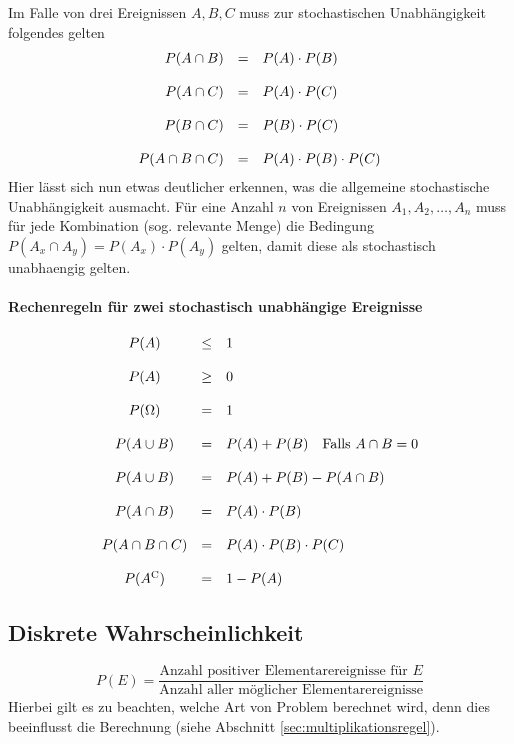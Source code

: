 Im Falle von drei Ereignissen $A,B,C$ muss zur stochastischen
Unabhängigkeit folgendes gelten
\[ \begin{array}{r c l}
	P(A \cap B)
		& = 
		& P(A) \cdot P(B) \\
	& & \\
	P(A \cap C)
		& =
		& P(A) \cdot P(C) \\
	& & \\
	P(B \cap C)
		& =
		& P(B) \cdot P(C) \\
	& & \\
	P(A \cap B \cap C)
		& =
		& P(A) \cdot P(B) \cdot P(C)
\end{array} \]
Hier lässt sich nun etwas deutlicher erkennen, was die allgemeine
stochastische Unabhängigkeit ausmacht. 
Für eine Anzahl $n$ von Ereignissen 
$A_1, A_2, \dots , A_n $ 
muss für jede Kombination (sog. relevante Menge) die Bedingung
$P(A_x \cap A_y) = P(A_x) \cdot P(A_y)$ gelten, damit diese
als \gls{stochastisch unabhaengig} gelten. 

\paragraph{Rechenregeln für zwei stochastisch unabhängige Ereignisse}
\[ \begin{array}{c c l}
	P(A)	
		& \leq
		& 1 \\
	& & \\
	P(A) 
		& \geq 
		& 0 \\
	& & \\
	P(\Omega) 
		& = 
		& 1 \\
	& & \\
	P(A \cup B) 
		& = 
		& P(A) + P(B) \quad \text{Falls } A \cap B = 0 \\
	& & \\
	P(A \cup B) 
		& = 
		& P(A) + P(B) - P(A \cap B) \\
	& & \\
	P(A \cap B) 
		& = 
		& P(A) \cdot P(B) \\
	& & \\
	P(A \cap B \cap C) 
		& = 
		& P(A) \cdot P(B) \cdot P(C) \\
	& & \\
	P(A^{\mathrm C}) 
		& = 
		& 1 - P(A)
\end{array} \]

\subsection{Diskrete Wahrscheinlichkeit}
\[ 
	P(E)
	= \frac{\text{Anzahl positiver Elementarereignisse für } E}{
		\text{Anzahl aller möglicher Elementarereignisse}}
\]
Hierbei gilt es zu beachten, welche Art von Problem berechnet wird, denn
dies beeinflusst die Berechnung (siehe Abschnitt 
\ref{sec:multiplikationsregel}).

